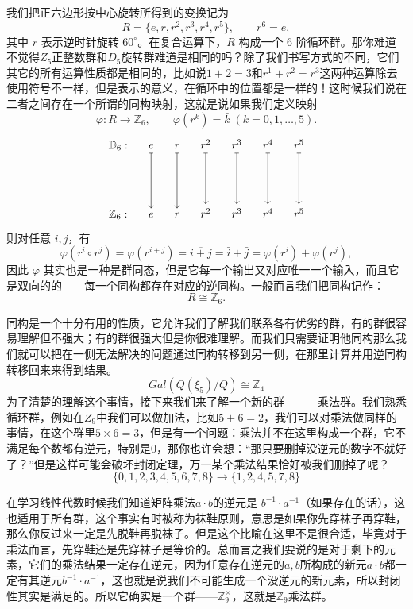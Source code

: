 \documentclass[UTF8]{ctexbook}
\begin{document}
我们把正六边形按中心旋转所得到的变换记为
\[
R=\{e,r,r^2,r^3,r^4,r^5\},\qquad r^6=e,
\]
其中 $r$ 表示逆时针旋转 $60^\circ$。在复合运算下，$R$ 构成一个 6 阶循环群。那你难道不觉得$Z_5$正整数群和$D_5$旋转群难道是相同的吗？除了我们书写方式的不同，它们其它的所有运算性质都是相同的，比如说$1+2=3$和$r^1+r^2=r^3$这两种运算除去使用符号不一样，但是表示的意义，在循环中的位置都是一样的！这时候我们说在二者之间存在一个所谓的同构映射，这就是说如果我们定义映射
\[
\varphi:R\to \mathbb{Z}_6,\qquad \varphi(r^k)=\bar{k}\;(k=0,1,\dots,5).
\]
\[
\begin{tikzcd}[column sep=1em, row sep=4.5em]
\mathbb{D}_6:
& e \arrow[d,mapsto]
& r \arrow[d,mapsto]
& r^2 \arrow[d,mapsto]
& r^3 \arrow[d,mapsto]
& r^4 \arrow[d,mapsto]
& r^5\arrow[d,mapsto]
\\
\mathbb{Z}_6:
& e 
& r 
& r^2 
& r^3 
& r^4 
& r^5 
\end{tikzcd}
\]
则对任意 $i,j$，有
\[
\varphi(r^i\circ r^j)=\varphi(r^{i+j})=\overline{i+j}=\bar{i}+\bar{j}
=\varphi(r^i)+\varphi(r^j),
\]
因此 $\varphi$ 其实也是一种是群同态，但是它每一个输出又对应唯一一个输入，而且它是双向的的——每一个同构都存在对应的逆同构。一般而言我们把同构记作：
\[
R\cong \mathbb{Z}_6.
\]

同构是一个十分有用的性质，它允许我们了解我们联系各有优劣的群，有的群很容易理解但不强大；有的群很强大但是你很难理解。而我们只需要证明他同构那么我们就可以把在一侧无法解决的问题通过同构转移到另一侧，在那里计算并用逆同构转移回来来得到结果。
\[
Gal(Q(\xi_5)/Q)\cong\mathbb{Z}_4
\]
为了清楚的理解这个事情，接下来我们来了解一个新的群———乘法群。我们熟悉循环群，例如在$Z_9$中我们可以做加法，比如$5+6=2$，我们可以对乘法做同样的事情，在这个群里$5 \times 6 = 3$，但是有一个问题：乘法并不在这里构成一个群，它不满足每个数都有逆元，特别是$0$，那你也许会想：“那只要删掉没逆元的数字不就好了？”但是这样可能会破坏封闭定理，万一某个乘法结果恰好被我们删掉了呢？
\[
\{0,1,2,3,4,5,6,7,8\}\longrightarrow\{1,2,4,5,7,8\}
\]

在学习线性代数时候我们知道矩阵乘法$a \cdot b $的逆元是 $b^{-1} \cdot a^{-1}$（如果存在的话），这也适用于所有群，这个事实有时被称为袜鞋原则，意思是如果你先穿袜子再穿鞋，那么你反过来一定是先脱鞋再脱袜子。但是这个比喻在这里不是很合适，毕竟对于乘法而言，先穿鞋还是先穿袜子是等价的。总而言之我们要说的是对于剩下的元素，它们的乘法结果一定存在逆元，因为任意存在逆元的$a,b$所构成的新元$a \cdot b $都一定有其逆元$b^{-1} \cdot a^{-1}$，这也就是说我们不可能生成一个没逆元的新元素，所以封闭性其实是满足的。所以它确实是一个群——$\mathbb{Z}_9^{\times}$，这就是$\mathbb{Z}_9$乘法群。
\end{document}
